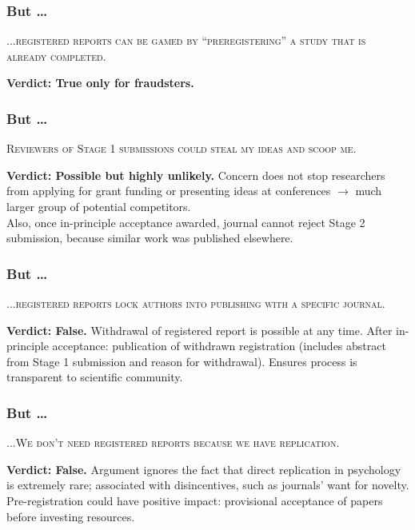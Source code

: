 \documentclass{beamer}
\begin{document}

\begin{frame}
\frametitle{But \dots}

\textsc{...registered reports can be gamed by ``preregistering'' a study that is already completed.}\\[12pt]

\pause

\textbf{Verdict: True only for fraudsters.}  

\end{frame}



\begin{frame}
\frametitle{But \dots}

\textsc{Reviewers of Stage 1 submissions could steal my ideas and scoop me.}\\[12pt]
\pause

\textbf{Verdict: Possible but highly unlikely.} Concern does not stop researchers from applying for grant funding or presenting ideas at conferences $\rightarrow$ much larger group of potential competitors.\\
Also, once in-principle acceptance awarded, journal cannot reject Stage 2 submission, because similar work was published elsewhere.  
\end{frame}



\begin{frame}
\frametitle{But \dots}

\textsc{...registered reports lock authors into publishing with a specific journal.}\\[12pt]

\pause

\textbf{Verdict: False.} Withdrawal of registered report is possible at any time. After in-principle acceptance: publication of withdrawn registration (includes abstract from Stage 1 submission and reason for withdrawal). Ensures process is transparent to scientific community. 

\end{frame}




\begin{frame}
\frametitle{But \dots}

\textsc{...We don't need registered reports because we have replication.}\\[12pt]

\pause

\textbf{Verdict: False.} Argument ignores the fact that direct replication in psychology is extremely rare; associated with disincentives, such as journals' want for novelty. \\Pre-registration could have positive impact: provisional acceptance of papers before investing resources. 
\end{frame}
\end{document}
